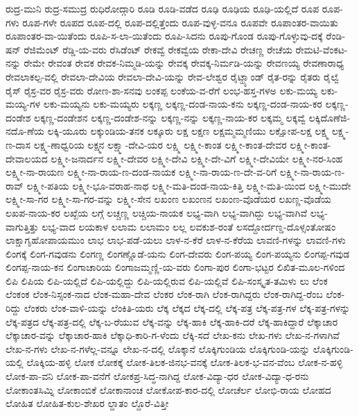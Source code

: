 {ರುದ್ರ-ಮುನಿ
ರುದ್ರ-ಸಮುದ್ರ
ರುಧಿರೋದ್ಗಾರಿ
ರೂಡಿ
ರೂಡಿ-ವಡೆದ
ರೂಢಿ
ರೂಢಿಯ
ರೂಢಿ-ಯಲ್ಲಿದೆ
ರೂಪ
ರೂಪ-ಗಳು
ರೂಪ-ಗಳೇ
ರೂಪದ
ರೂಪ-ದಲ್ಲಿ
ರೂಪ-ದಲ್ಲಿತ್ತೆಂದು
ರೂಪ-ವುಳ್ಳ-ವನೂ
ರೂಪವೇ
ರೂಪಾಂತರ-ವಾಯಿತು
ರೂಪಾಂತರ-ವಾ-ಯಿತೆಂದು
ರೂಪಿ-ಸ-ಲಾ-ಯಿತೆಂದು
ರೂಪಿ-ಸಿದನು
ರೂಪು-ಗೊಂಡ
ರೂಪು-ಗೊಳ್ಳುವು-ದಕ್ಕೆ
ರೆಂಡಿ-ಷನ್
ರೆಜಿಮೆಂಟ್
ರೆಡ್ಡಿ-ಯ-ವರು
ರೆಸಿಡೆಂಟ್
ರೇಕವ್ವೆ
ರೇಕವ್ವೆಯ
ರೇಕಾ-ದೇವಿ
ರೇಚಣ್ಣ
ರೇಚೆಯ
ರೇಮಟಿ-ವೆಂಕಟ-ನನ್ನು
ರೇಮೇ
ರೇವಂತ
ರೇವಕ
ರೇವಕ-ನಿಮ್ಮಡಿ-ಯನ್ನು
ರೇವಕ್ಕ
ರೇವಕ್ಕ-ನಿರ್ಮಡಿ-ಯನ್ನು
ರೇವಣಯ್ಯ
ರೇವಣಾರಾಧ್ಯ
ರೇವಲಾಕಲ್ಪ-ವಲ್ಲಿ
ರೇವಲಾ-ದೇವಿಯ
ರೇವಲಾ-ದೇವಿ-ಯನ್ನು
ರೇವ-ಲೇಶ್ವರ
ರೈಟ್ಹ್ಯಾಂಡ್
ರೈತ-ರನ್ನು
ರೈತರು
ರೈಲ್ವೆ
ರೈಸ್
ರೈಸ್ರ-ವರ
ರೈಸ್ರ-ವರು
ರೋಣ-ಶಾ-ಸನವು
ಲಂಕಪ್ಪ
ಲಂಕೆಯ-ವ-ರೆಗೆ
ಲಂಭ-ಹಸ್ತ-ಗಳಅ
ಲಕು-ಮಯ್ಯ
ಲಕು-ಮಯ್ಯ-ಗಳ
ಲಕು-ಮಯ್ಯನು
ಲಕು-ಮಯ್ಯರು
ಲಕ್ಕಣ್ಣ
ಲಕ್ಕಣ್ಣ-ದಂಡ-ನಾಯ-ಕನು
ಲಕ್ಕಣ್ಣ-ದಂಡ-ನಾಯ-ಕರ
ಲಕ್ಕಣ್ಣ-ದಂಡೇಶ
ಲಕ್ಕಣ್ಣ-ದಂಡೇಶನ
ಲಕ್ಕಣ್ಣ-ದಂಡೇಶ-ನನ್ನು
ಲಕ್ಕಣ್ಣ-ನನ್ನು
ಲಕ್ಕಣ್ಣ-ನಾಯ-ಕರ
ಲಕ್ಕಮ್ಮ
ಲಕ್ಕವ್ವೆ
ಲಕ್ಕಿದೊಣೆಜಿ-ನದೊ-ಣೆಯ
ಲಕ್ಕಿ-ಯೂರು
ಲಕ್ಕುಂಡಿಯ-ತನಕ
ಲಕ್ಕೂರು
ಲಕ್ಷ
ಲಕ್ಷಣ
ಲಕ್ಷಮ್ಮಮ್ಮಣಿಯು
ಲಕ್ಷೋಪ-ಲಕ್ಷ
ಲಕ್ಷ್ಮ
ಲಕ್ಷ್ಮ-ಣ-ದಾಸ
ಲಕ್ಷ್ಮ-ಣಾಧ್ವರಿಯ
ಲಕ್ಷ್ಮನ
ಲಕ್ಷ್ಮಾ-ದೇವಿ-ಯರ
ಲಕ್ಷ್ಮಿ
ಲಕ್ಷ್ಮೀ-ಕಾಂತ
ಲಕ್ಷ್ಮೀ-ಕಾಂತ-ದೇವರ
ಲಕ್ಷ್ಮೀ-ಕಾಂತ-ದೇವಾಲಯದ
ಲಕ್ಷ್ಮೀ-ಜನಾರ್ದನ
ಲಕ್ಷ್ಮೀ-ದೇವರ
ಲಕ್ಷ್ಮೀ-ದೇವಿ
ಲಕ್ಷ್ಮೀ-ದೇ-ವಿಗೆ
ಲಕ್ಷ್ಮೀ-ದೇವಿಯೇ
ಲಕ್ಷ್ಮೀ-ನರ-ಸಿಂಹ
ಲಕ್ಷ್ಮೀ-ನಾ-ರಾಯಣ
ಲಕ್ಷ್ಮೀ-ನಾ-ರಾಯ-ಣ-ದಂಡ-ನಾಯಕ
ಲಕ್ಷ್ಮೀ-ನಾ-ರಾಯ-ಣ-ದೇ-ವ-ರಿಗೆ
ಲಕ್ಷ್ಮೀ-ನಾ-ರಾಯ-ಣ-ರಾವ್
ಲಕ್ಷ್ಮೀ-ಪತಿಯ
ಲಕ್ಷ್ಮೀ-ಭೂ-ವರಾಹ-ನಾಥ
ಲಕ್ಷ್ಮೀ-ಮತಿ-ದಂಡ-ನಾಯ-ಕಿತ್ತಿ
ಲಕ್ಷ್ಮೀ-ಮತಿ-ಯಿಂದ
ಲಕ್ಷ್ಮೀ-ಮುದೇ
ಲಕ್ಷ್ಮೀ-ಸಾ-ಗರ
ಲಕ್ಷ್ಮೀ-ಸಾ-ಗರ-ವನ್ನು
ಲಕ್ಷ್ಮೀ-ಸೇನ
ಲಖಂಣ
ಲಖಂಣನ
ಲಖಂಣ-ವೊಡೆಯರ
ಲಖಣ್ಣ-ವೊಡೆಯ
ಲಖಪ-ನಾಯ-ಕರ
ಲಖ್ಖೆಯ
ಲಗ್ಗೆ
ಲಚ್ಚಣ್ಣ
ಲಚ್ಚಿಯ-ನಾಯಕ
ಲಭ್ಯ-ವಾಗಿ
ಲಭ್ಯ-ವಾಗಿದ್ದು
ಲಭ್ಯ-ವಾಗಿವೆ
ಲಭ್ಯ-ವಾಗುತ್ತಿತ್ತು
ಲಭ್ಯ-ವಾದ
ಲಯಕಾಳ
ಲಲಾಮ
ಲಲಾಮಂ
ಲಲ್ಲ
ಲವಕುಶ-ರಂತೆ
ಲಸದ್ದೋರ್ದಣ್ಡ-ದೊಳ್ಸಂತೋಷಂ
ಲಾಕ್ಷಾಗೃಹೋಪಾಯಮುಂ
ಲಾಭ
ಲಾಭ-ಪಡೆ-ಯಲು
ಲಾಳ-ನ-ಕೆರೆ
ಲಾಳ-ನ-ಕೆರೆಯ
ಲಾವಣಿ-ಗಳನ್ನು
ಲಾವಣಿ-ಗಳು
ಲಿಂಗಕ್ಕೆ
ಲಿಂಗ-ಗವುಡನು
ಲಿಂಗಣ್ಣ
ಲಿಂಗಣ್ಣೊಡೆ-ಯನು
ಲಿಂಗ-ದೇವರು
ಲಿಂಗ-ಪಯ್ಯ
ಲಿಂಗ-ಪಯ್ಯನು
ಲಿಂಗಪ್ಪ-ಗವುಡ
ಲಿಂಗಪ್ಪ-ನಾಯ-ಕನ
ಲಿಂಗಾಚಾರಿಯ
ಲಿಂಗಾಜಮ್ಮಣ್ಣಿ-ಯ-ವರು
ಲಿಂಗಾ-ಪುರ
ಲಿಂಗಾ-ಭಟ್ಟರ
ಲಿಖಿತ-ಮೂಲ-ಗಳಿಂದ
ಲಿಪಿ
ಲಿಪಿಯ
ಲಿಪಿ-ಯಲ್ಲಿದೆ
ಲಿಪಿ-ಯಲ್ಲಿದ್ದು
ಲಿಪಿ-ಯಲ್ಲಿರುವ
ಲಿಪಿ-ಯಲ್ಲಿವೆ
ಲಿಪಿ-ಸಂಸ್ಕೃತ-ತಮಿಳು
ಲು
ಲೆಂಕ
ಲೆಂಕಂಕ
ಲೆಂಕ-ನಿಸ್ಸಂಕ-ನಾದ
ಲೆಂಕ-ಮಹಾ-ದೇವ
ಲೆಂಕರ
ಲೆಂಕ-ರಾಗಿ
ಲೆಂಕ-ರಾಗಿದ್ದರು
ಲೆಂಕ-ರಾಗಿದ್ದ-ರೆಂಬ
ಲೆಂಕ-ರಿದ್ದು
ಲೆಂಕರು
ಲೆಂಕ-ವಾಳಿ-ಯನ್ನು
ಲೆಂಕಿತಿ-ಯರು
ಲೆಕ್ಕ
ಲೆಕ್ಕದ
ಲೆಕ್ಕ-ದಲ್ಲಿ
ಲೆಕ್ಕ-ಪತ್ರ
ಲೆಕ್ಕ-ಪತ್ರ-ಗಳ
ಲೆಕ್ಕ-ಪತ್ರ-ಗಳನ್ನು
ಲೆಕ್ಕ-ಪತ್ರದ
ಲೆಕ್ಕ-ಪತ್ರ-ದಲ್ಲಿ
ಲೆಕ್ಕ-ಬ-ರೆಯುವ
ಲೆಕ್ಕ-ವನ್ನು
ಲೆಕ್ಕ-ಹಾಕಿ
ಲೆಕ್ಕ-ಹಾಕಿ-ದರೆ
ಲೆಕ್ಕ-ಹಾಕಿದ್ದಾರೆ
ಲೆಕ್ಕಾಚಾರ
ಲೆಕ್ಕಾಚಾರ-ವನ್ನು
ಲೆಕ್ಕಾಚಾರ-ಹಾಕಿ
ಲೆಕ್ಕಾಧಿ-ಕಾರಿ-ಗ-ಳೆಂದು
ಲೆಕ್ಕಿ-ಸದೆ
ಲೇಖ-ಕನು
ಲೇಖ-ಗಳು
ಲೇಖ-ನ-ಗಳಾಗಿವೆ
ಲೇಖ-ನ-ಗಳು
ಲೇಖ-ನ-ಗಳೆಲ್ಲ-ವನ್ನೂ
ಲೇಖ-ನ-ದಲ್ಲಿ
ಲೊಕ್ಕಾನೆ
ಲೊಕ್ಕಿಗುಂಡಿಯ
ಲೊಕ್ಕಿಗುಂಡಿ-ಯನ್ನು
ಲೊಕ್ಕಿಗುಂಡಿ-ಯಲ್ಲಿ
ಲೊಕ್ಕಿಯ-ಹಳ್ಳಿ
ಲೋಕ
ಲೋಕಕ್ಕೆ
ಲೋಕ-ತಿಲಕ-ಜಿನಭ-ವನಕ್ಕೆ
ಲೋಕ-ತಿಲಕ-ಭ-ವನ-ವೆಂಬ
ಲೋಕ-ನ-ಹಳ್ಳಿ
ಲೋಕ-ಪಾ-ವನಿ
ಲೋಕ-ಪಾ-ವನೆಗೆ
ಲೋಕಪ್ರ-ಸಿದ್ಧ-ನಾಗಿದ್ದ
ಲೋಕ-ವಿದ್ಯಾ-ಧರ
ಲೋಕ-ವಿದ್ಯಾ-ಧ-ರನು
ಲೋಕಾಂತಸಿಮ್ನಿ
ಲೋಕಾಂಬಿಕೆ
ಲೋಕಾನಾಂಚ
ಲೋಕೋಪ-ಕಾರ-ದಲ್ಲಿ
ಲೋಚೆರ್ಲ
ಲೋಭಿ-ರಾಯ
ಲೋಹದ
ಲೋಹಿತ
ಲೋಹಿತ-ಕುಲ-ಶೇಖರ
ಲ್ದಾತಂ
ಲ್ದೊರೆ-ವಿತ್ತೀ
}
